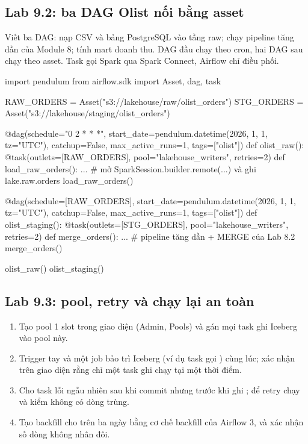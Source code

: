 \subsection{Lab 9.2: ba DAG Olist nối bằng asset}
Viết ba DAG:  nạp CSV và bảng PostgreSQL vào tầng raw;  chạy pipeline tăng dần của Module 8;  tính mart doanh thu. DAG đầu chạy theo cron, hai DAG sau chạy theo asset. Task gọi Spark qua Spark Connect, Airflow chỉ điều phối.
\begin{codeblock}
import pendulum
from airflow.sdk import Asset, dag, task

RAW_ORDERS = Asset("s3://lakehouse/raw/olist_orders")
STG_ORDERS = Asset("s3://lakehouse/staging/olist_orders")

@dag(schedule="0 2 * * *", start_date=pendulum.datetime(2026, 1, 1, tz="UTC"),
     catchup=False, max_active_runs=1, tags=["olist"])
def olist_raw():
    @task(outlets=[RAW_ORDERS], pool="lakehouse_writers", retries=2)
    def load_raw_orders():
        ...  # mở SparkSession.builder.remote(...) và ghi lake.raw.orders
    load_raw_orders()

@dag(schedule=[RAW_ORDERS], start_date=pendulum.datetime(2026, 1, 1, tz="UTC"),
     catchup=False, max_active_runs=1, tags=["olist"])
def olist_staging():
    @task(outlets=[STG_ORDERS], pool="lakehouse_writers", retries=2)
    def merge_orders():
        ...  # pipeline tăng dần + MERGE của Lab 8.2
    merge_orders()

olist_raw()
olist_staging()
\end{codeblock}

\subsection{Lab 9.3: pool, retry và chạy lại an toàn}
\begin{enumerate}
  \item Tạo pool  1 slot trong giao diện (Admin, Pools) và gán mọi task ghi Iceberg vào pool này.
  \item Trigger tay  và một job bảo trì Iceberg (ví dụ task gọi ) cùng lúc; xác nhận trên giao diện rằng chỉ một task ghi chạy tại một thời điểm.
  \item Cho task  lỗi ngẫu nhiên sau khi  commit nhưng trước khi ghi ; để retry chạy và kiểm không có dòng trùng.
  \item Tạo backfill cho  trên ba ngày bằng cơ chế backfill của Airflow 3, và xác nhận số dòng không nhân đôi.
\end{enumerate}

